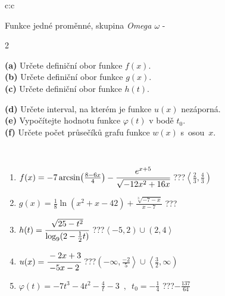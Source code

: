 \documentclass[10pt]{report}
\begin{document}
\begin{tabular}{c:c}
\begin{minipage}[c][104.5mm][t]{0.5\linewidth}
\begin{center}
\vspace{7mm}
{\huge Funkce jedné proměnné, skupina \textit{Omega $\omega$} -}\\[5mm]
\begin{minipage}{0.95\linewidth}
\begin{center}
{\small \begin{multicols}{2} \raggedright
\textbf{(a)} Určete definiční obor funkce \(f(x)\). \\[1mm]
\textbf{(b)} Určete definiční obor funkce \(g(x)\). \\[1mm]
\textbf{(c)} Určete definiční obor funkce \(h(t)\). \par \columnbreak
\textbf{(d)} Určete interval, na kterém je funkce \(u(x)\) nezáporná. \\[1mm]
\textbf{(e)} Vypočítejte hodnotu funkce \(\varphi(t)\) v bodě \(t_0\). \\[1mm]
\textbf{(f)} Určete počet průsečíků grafu funkce \(w(x)\) s~osou~\(x\). \\[1mm]
\end{multicols}
}
\end{center}
\end{minipage}
\\[4mm]
\begin{minipage}{0.79\linewidth}
\begin{center}
\begin{varwidth}{\linewidth}
\begin{enumerate}
\small
\item $f(x) = -7\arcsin\!\left( \frac{8-6x}{4} \right) - \cfrac{e^{x+5}}{\sqrt{-12x^2+16x}}$\quad \dotfill\; ???\;\dotfill \quad $\left\langle\frac{2}{3} , \frac{4}{3}\right)$
\item $g(x) = \frac{1}{8} \ln{\!(x^2+x-42)}+\frac{\sqrt[3]{-7-x}}{x-7}$\quad \dotfill\; ???\;\dotfill {}
\item $h(t) = \cfrac{\sqrt{25-t^2}}{\log_9(2-\frac{1}{2}t)}$\quad \dotfill\; ???\;\dotfill \quad $\left\langle-5 , 2\right)\cup\left(2 , 4\right\rangle$
\item $u(x) = \cfrac{-2x+3}{-5x-2}$\quad \dotfill\; ???\;\dotfill \quad $\left(-\infty , \frac{-2}{5}\right\rangle\cup\left\langle\frac{3}{2} , \infty\right)$
\item $\varphi(t) = -7t^3-4t^2-\frac{4}{t}-3 \enspace , \enspace t_0=-\frac{1}{4}$\quad \dotfill\; ???\;\dotfill \quad $-\frac{137}{64}$

\end{enumerate}
\end{varwidth}
\end{center}
\end{minipage}
\end{center}
\end{minipage}
\end{tabular}
\end{document}
